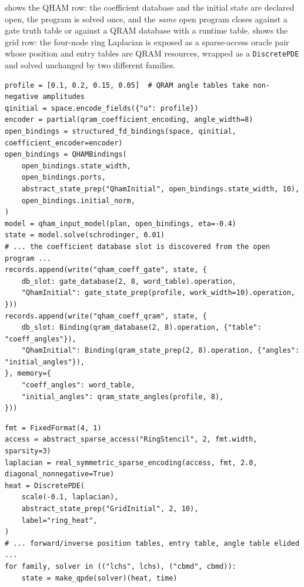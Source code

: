  shows the QHAM row: the coefficient database and
the initial state are declared open, the program is solved once, and the
\emph{same} open program closes against a gate truth table or against a
QRAM database with a runtime table.   shows the
grid row: the four-node ring Laplacian is exposed as a sparse-access
oracle pair whose position and entry tables are QRAM resources, wrapped
as a \texttt{DiscretePDE} and solved unchanged by two different families.

\begin{lstlisting}[style=pyqpython, caption={QHAM with a coefficient-angle database: one open program, closed against a gate database or a QRAM database (condensed from \texttt{examples/input\_models.py}; comments translated, slot discovery and artifact records elided).}, label={lst:input-qham}]
profile = [0.1, 0.2, 0.15, 0.05]  # QRAM angle tables take non-negative amplitudes
qinitial = space.encode_fields({"u": profile})
encoder = partial(qram_coefficient_encoding, angle_width=8)
open_bindings = structured_fd_bindings(space, qinitial, coefficient_encoder=encoder)
open_bindings = QHAMBindings(
    open_bindings.state_width,
    open_bindings.ports,
    abstract_state_prep("QhamInitial", open_bindings.state_width, 10),
    open_bindings.initial_norm,
)
model = qham_input_model(plan, open_bindings, eta=-0.4)
state = model.solve(schrodinger, 0.01)
# ... the coefficient database slot is discovered from the open program ...
records.append(write("qham_coeff_gate", state, {
    db_slot: gate_database(2, 8, word_table).operation,
    "QhamInitial": gate_state_prep(profile, work_width=10).operation,
}))
records.append(write("qham_coeff_qram", state, {
    db_slot: Binding(qram_database(2, 8).operation, {"table": "coeff_angles"}),
    "QhamInitial": Binding(qram_state_prep(2, 8).operation, {"angles": "initial_angles"}),
}, memory={
    "coeff_angles": word_table,
    "initial_angles": qram_state_angles(profile, 8),
}))
\end{lstlisting}

\begin{lstlisting}[style=pyqpython, caption={A QRAM-served grid discretization: the ring Laplacian as a sparse-access oracle pair with QRAM position and entry tables, plus a QRAM initial state; \texttt{make\_qpde} threads it into two solver families unchanged (verbatim from \texttt{examples/input\_models.py}; comments translated, runtime tables elided).}, label={lst:input-grid}]
fmt = FixedFormat(4, 1)
access = abstract_sparse_access("RingStencil", 2, fmt.width, sparsity=3)
laplacian = real_symmetric_sparse_encoding(access, fmt, 2.0, diagonal_nonnegative=True)
heat = DiscretePDE(
    scale(-0.1, laplacian),
    abstract_state_prep("GridInitial", 2, 10),
    label="ring_heat",
)
# ... forward/inverse position tables, entry table, angle table elided ...
for family, solver in (("lchs", lchs), ("cbmd", cbmd)):
    state = make_qpde(solver)(heat, time)
\end{lstlisting}

